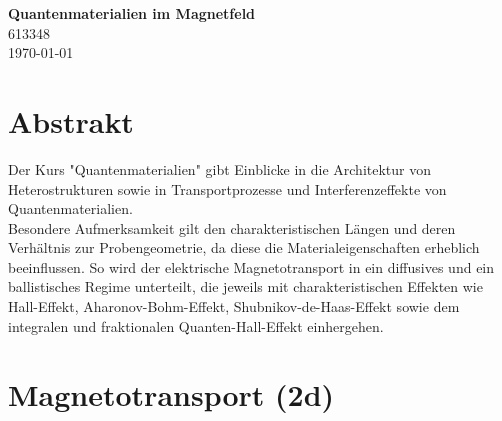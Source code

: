 \documentclass{article}
\begin{document}
\begin{center}
	\Large{\textbf{Quantenmaterialien im Magnetfeld}}\\
	\small{613348}\\
	\small{\today}
\end{center}

\tableofcontents


\newpage


\section*{Abstrakt}
Der Kurs "Quantenmaterialien" gibt Einblicke in die Architektur von Heterostrukturen sowie in Transportprozesse und Interferenzeffekte von Quantenmaterialien.\\
Besondere Aufmerksamkeit gilt den charakteristischen Längen und deren Verhältnis zur Probengeometrie, da diese die Materialeigenschaften erheblich beeinflussen. So wird der elektrische Magnetotransport in ein diffusives und ein ballistisches Regime unterteilt, die jeweils mit charakteristischen Effekten wie Hall-Effekt, Aharonov-Bohm-Effekt, Shubnikov-de-Haas-Effekt sowie dem integralen und fraktionalen Quanten-Hall-Effekt einhergehen.


\newpage


\section{Magnetotransport (2d)}
\end{document}
